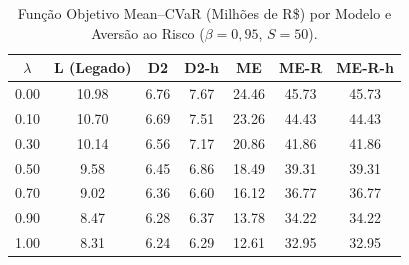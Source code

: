\begin{table}[t]
\centering
\caption{Função Objetivo Mean--CVaR (Milhões de R\$) por Modelo e Aversão ao Risco ($\beta = 0{,}95$, $S = 50$).}
\label{tab:comparativo_fo}
\begin{tabular}{ccccccc}
\hline
$\lambda$ & L (Legado) & D2 & D2-h & ME & ME-R & ME-R-h \\
\hline
  0.00 & 10.98 & 6.76 & 7.67 & 24.46 & 45.73 & 45.73 \\
  0.10 & 10.70 & 6.69 & 7.51 & 23.26 & 44.43 & 44.43 \\
  0.30 & 10.14 & 6.56 & 7.17 & 20.86 & 41.86 & 41.86 \\
  0.50 & 9.58 & 6.45 & 6.86 & 18.49 & 39.31 & 39.31 \\
  0.70 & 9.02 & 6.36 & 6.60 & 16.12 & 36.77 & 36.77 \\
  0.90 & 8.47 & 6.28 & 6.37 & 13.78 & 34.22 & 34.22 \\
  1.00 & 8.31 & 6.24 & 6.29 & 12.61 & 32.95 & 32.95 \\
\hline
\end{tabular}
\end{table}
